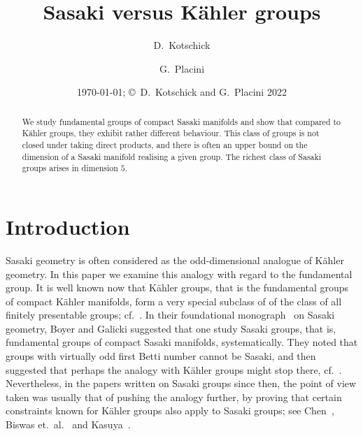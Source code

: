 \documentclass[12pt,leqno]{amsart}
\begin{document}
\title{Sasaki versus K\"ahler groups}

\author{D.~Kotschick}
\address{Mathematisches Institut, Ludwig-Maximilians-Universit\"at
M\"unchen, Theresienstr.~39, 80333 M\"unchen, Germany}

\author{G.~Placini}
\address{Dipartimento di Matematica e Informatica “Ulisse Dini”, Universit\`{a} di Firenze, viale Morgagni 67/A, 50134 Firenze, Italy}



\date{\today ; {\copyright \ D.~Kotschick and G.~Placini 2022}}





\begin{abstract}
We study fundamental groups of compact Sasaki manifolds and show that compared 
to K\"ahler groups, they exhibit rather different behaviour. This class of groups is
not closed under taking direct products, and there is often an upper bound
on the dimension of a Sasaki manifold realising a given group. 
The richest class of Sasaki groups arises in dimension $5$.
\end{abstract}
 
\maketitle



\section{Introduction}

Sasaki geometry is often considered as the odd-dimensional analogue of K\"ahler geometry. In this paper 
we examine this analogy with regard to the fundamental group. It is well known now that K\"ahler groups,
 that is the fundamental groups of compact K\"ahler manifolds, form a very special subclass of of the 
 class of all finitely presentable groups; cf.~\cite{ABCKT}. 
 In their foundational monograph~\cite{Boyer} on Sasaki geometry, Boyer and Galicki suggested that 
 one study Sasaki groups, that is, fundamental groups of compact Sasaki manifolds, systematically. 
 They noted that groups with virtually odd first Betti number cannot be Sasaki, and then suggested that perhaps 
 the analogy with K\"ahler groups might stop there, cf.~\cite[p.~236]{Boyer}. 
 Nevertheless, in the papers written on Sasaki groups since then, the point of view taken was usually 
 that of pushing the analogy further, by proving that certain constraints known for K\"ahler groups also apply 
 to Sasaki groups; see Chen~\cite{Chen}, Biswas et.~al.~\cite{BFMT,BM} and Kasuya~\cite{Kas2,Kas1}.
 
\end{document}
